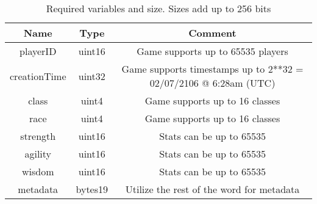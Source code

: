 \begin{table}[H]
	\centering
	\vspace*{-1ex}
	\scriptsize
	\caption{Required variables and size. Sizes add up to 256 bits}
	\vspace{-1ex}
	\label{character}
	\begin{tabular}{|c|c|c|}
        \hline
        \textbf{Name} & \textbf{Type}  & \textbf{Comment}\\ \hline 
        playerID      & uint16         & Game supports up to 65535 players\\
        creationTime  & uint32         & Game supports timestamps up to 2**32 = 02/07/2106 @ 6:28am (UTC) \\
        class         & uint4          & Game supports up to 16 classes \\
        race          & uint4          & Game supports up to 16 classes \\
        strength      & uint16         & Stats can be up to 65535\\
        agility       & uint16         & Stats can be up to 65535 \\
        wisdom        & uint16         & Stats can be up to 65535 \\
        metadata      & bytes19        & Utilize the rest of the word for metadata \\
        \hline
    \end{tabular}
\end{table}